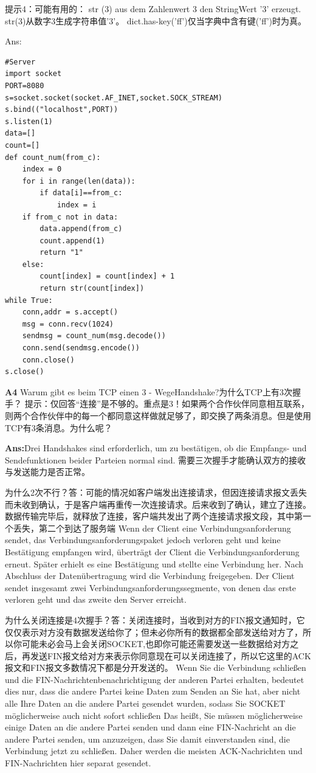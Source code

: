 \documentclass[fleqn]{article}
\begin{document}
提示4：可能有用的：
str (3) aus dem Zahlenwert 3 den StringWert '3' erzeugt. str(3)从数字3生成字符串值'3'。
dict.has-key('ff')仅当字典中含有键('ff')时为真。

Ans:

\begin{lstlisting}
#Server
import socket
PORT=8080
s=socket.socket(socket.AF_INET,socket.SOCK_STREAM)
s.bind(("localhost",PORT))
s.listen(1)
data=[]
count=[]
def count_num(from_c):
    index = 0
    for i in range(len(data)):
        if data[i]==from_c:
            index = i
    if from_c not in data:
        data.append(from_c)
        count.append(1)
        return "1"
    else:
        count[index] = count[index] + 1
        return str(count[index])
while True:
    conn,addr = s.accept()
    msg = conn.recv(1024)
    sendmsg = count_num(msg.decode())
    conn.send(sendmsg.encode())
    conn.close()
s.close()
\end{lstlisting}

\noindent\textbf{A4} Warum gibt es beim TCP einen 3 - WegeHandshake?为什么TCP上有3次握手？
提示：仅回答“连接”是不够的。重点是3！如果两个合作伙伴同意相互联系，则两个合作伙伴中的每一个都同意这样做就足够了，即交换了两条消息。但是使用TCP有3条消息。为什么呢？

\textbf{Ans:}Drei Handshakes sind erforderlich, um zu bestätigen, ob die Empfangs- und Sendefunktionen beider Parteien normal sind.
需要三次握手才能确认双方的接收与发送能力是否正常。

为什么2次不行？答：可能的情况如客户端发出连接请求，但因连接请求报文丢失而未收到确认，于是客户端再重传一次连接请求。后来收到了确认，建立了连接。数据传输完毕后，就释放了连接，客户端共发出了两个连接请求报文段，其中第一个丢失，第二个到达了服务端
Wenn der Client eine Verbindungsanforderung sendet, das Verbindungsanforderungspaket jedoch verloren geht und keine Bestätigung empfangen wird, überträgt der Client die Verbindungsanforderung erneut. Später erhielt es eine Bestätigung und stellte eine Verbindung her. Nach Abschluss der Datenübertragung wird die Verbindung freigegeben. Der Client sendet insgesamt zwei Verbindungsanforderungssegmente, von denen das erste verloren geht und das zweite den Server erreicht.

为什么关闭连接是4次握手？答：关闭连接时，当收到对方的FIN报文通知时，它仅仅表示对方没有数据发送给你了；但未必你所有的数据都全部发送给对方了，所以你可能未必会马上会关闭SOCKET,也即你可能还需要发送一些数据给对方之后，再发送FIN报文给对方来表示你同意现在可以关闭连接了，所以它这里的ACK报文和FIN报文多数情况下都是分开发送的。
Wenn Sie die Verbindung schließen und die FIN-Nachrichtenbenachrichtigung der anderen Partei erhalten, bedeutet dies nur, dass die andere Partei keine Daten zum Senden an Sie hat, aber nicht alle Ihre Daten an die andere Partei gesendet wurden, sodass Sie SOCKET möglicherweise auch nicht sofort schließen Das heißt, Sie müssen möglicherweise einige Daten an die andere Partei senden und dann eine FIN-Nachricht an die andere Partei senden, um anzuzeigen, dass Sie damit einverstanden sind, die Verbindung jetzt zu schließen. Daher werden die meisten ACK-Nachrichten und FIN-Nachrichten hier separat gesendet.
\end{document}
